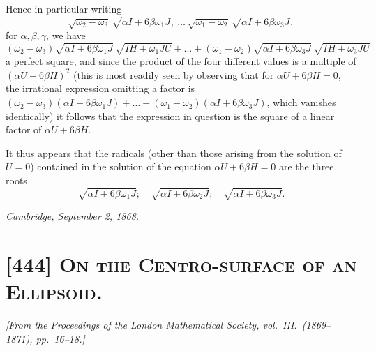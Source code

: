 \documentclass[11pt,a4paper]{article}
\begin{document}
\medskip

Hence in particular writing
\[
\sqrt{\omega_2 - \omega_3}\,\sqrt{\alpha I + 6\beta\omega_1 J},\ \ldots\ \sqrt{\omega_1 - \omega_2}\,\sqrt{\alpha I + 6\beta\omega_3 J},
\]
for $\alpha, \beta, \gamma$, we have
\[
(\omega_2 - \omega_3)\sqrt{\alpha I + 6\beta\omega_1 J}\,\sqrt{IH + \omega_1 JU} + \ldots
+ (\omega_1 - \omega_2)\sqrt{\alpha I + 6\beta\omega_3 J}\,\sqrt{IH + \omega_3 JU}
\]
a perfect square, and since the product of the four different values is a multiple of
$(\alpha U + 6 \beta H)^2$ (this is most readily seen by observing that for $\alpha U + 6 \beta H = 0$,
the irrational expression omitting a factor is
$(\omega_2 - \omega_3)(\alpha I + 6\beta\omega_1 J) + \ldots + (\omega_1 - \omega_2)(\alpha I + 6\beta\omega_3 J)$,
which vanishes identically) it follows that the expression in question is the square of a
linear factor of $\alpha U + 6 \beta H$.

\medskip

It thus appears that the radicals (other than those arising from the solution of $U = 0$)
contained in the solution of the equation $\alpha U + 6 \beta H = 0$ are the three roots
\[
\sqrt{\alpha I + 6\beta\omega_1 J};\quad \sqrt{\alpha I + 6\beta\omega_2 J};\quad \sqrt{\alpha I + 6\beta\omega_3 J}.
\]

\begin{flushright}
\textit{Cambridge, September 2, 1868.}
\end{flushright}

\bigskip

\section{[444] \textsc{On the Centro-surface of an Ellipsoid.}}

\begin{center}
\textit{[From the Proceedings of the London Mathematical Society, vol.\ III.\ (1869--1871), pp.\ 16--18.]}
\end{center}

\medskip
\end{document}

